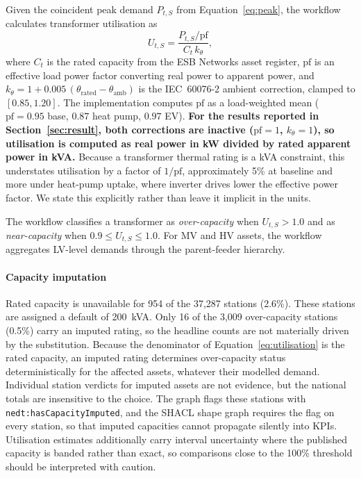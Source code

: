 \documentclass[preprint,12pt]{elsarticle}
\begin{document}
Given the coincident peak demand $P_{t,S}$ from
Equation~\eqref{eq:peak}, the workflow calculates transformer utilisation as
\begin{equation}
  U_{t,S} =
    \frac{P_{t,S} / \mathrm{pf}}{C_t \, k_{\theta}},
  \label{eq:utilisation}
\end{equation}
where $C_t$ is the rated capacity from the ESB Networks asset register,
$\mathrm{pf}$ is an effective load power factor converting real power to
apparent power, and $k_{\theta} = 1 + 0.005\,(\theta_{\mathrm{rated}} -
\theta_{\mathrm{amb}})$ is the IEC~60076-2 ambient correction, clamped to
$[0.85, 1.20]$.
The implementation computes $\mathrm{pf}$ as a load-weighted mean
($\mathrm{pf} = 0.95$ base, $0.87$ heat pump, $0.97$ EV).
\textbf{For the results reported in Section~\ref{sec:result}, both
corrections are inactive ($\mathrm{pf} = 1$, $k_{\theta} = 1$), so
utilisation is computed as real power in kW divided by rated apparent power
in kVA.} Because a transformer thermal rating is a kVA constraint, this
understates utilisation by a factor of $1/\mathrm{pf}$, approximately 5\% at
baseline and more under heat-pump uptake, where inverter drives lower the
effective power factor. We state this explicitly rather than leave it
implicit in the units.

The workflow classifies a transformer as \emph{over-capacity} when
$U_{t,S} > 1.0$ and as \emph{near-capacity} when
$0.9 \leq U_{t,S} \leq 1.0$.
For MV and HV assets, the workflow aggregates LV-level demands through the
parent-feeder hierarchy.

\paragraph{Capacity imputation}
Rated capacity is unavailable for 954 of the 37,287 stations
(2.6\%). These stations are assigned a default of 200~kVA.
Only 16 of the 3,009 over-capacity stations (0.5\%) carry an imputed rating,
so the headline counts are not materially driven by the substitution.
Because the denominator of Equation~\eqref{eq:utilisation} is the rated
capacity, an imputed rating determines over-capacity status
deterministically for the affected assets, whatever their modelled demand.
Individual station verdicts for imputed assets are not evidence, but the
national totals are insensitive to the choice.
The graph flags these stations with \texttt{nedt:hasCapacityImputed}, and
the SHACL shape graph requires the flag on every station, so that imputed
capacities cannot propagate silently into KPIs.
Utilisation estimates additionally carry interval uncertainty where the
published capacity is banded rather than exact, so comparisons close to the
100\% threshold should be interpreted with caution.
\end{document}
